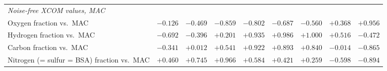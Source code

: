 \begin{table}[pos=H]
{\begin{tabular}{l cccccccc}
\midrule
\multicolumn{9}{l}{\emph{Noise-free XCOM values, MAC}} \\
Oxygen fraction vs.\ MAC & $-0.126$ & $-0.469$ & $-0.859$ & $-0.802$ & $-0.687$ & $-0.560$ & $+0.368$ & $+0.956$ \\
Hydrogen fraction vs.\ MAC & $-0.692$ & $-0.396$ & $+0.201$ & $+0.935$ & $+0.986$ & $+1.000$ & $+0.516$ & $-0.472$ \\
Carbon fraction vs.\ MAC & $-0.341$ & $+0.012$ & $+0.541$ & $+0.922$ & $+0.893$ & $+0.840$ & $-0.014$ & $-0.865$ \\
Nitrogen (= sulfur = BSA) fraction vs.\ MAC & $+0.460$ & $+0.745$ & $+0.966$ & $+0.584$ & $+0.421$ & $+0.259$ & $-0.598$ & $-0.894$ \\
\bottomrule
\end{tabular}}
\end{table}
